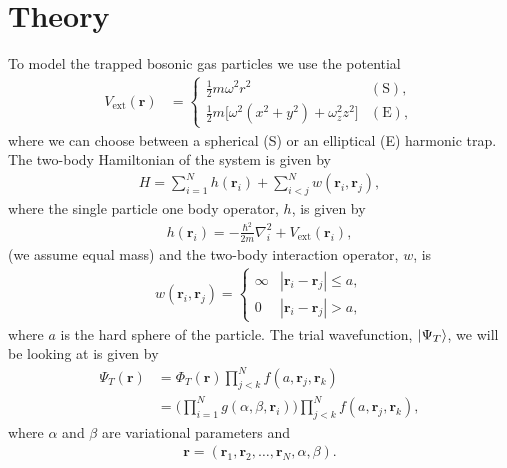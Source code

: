 \documentclass[
    a4paper, aps, twocolumn, floatfix, superscriptaddress, nofootinbib]{revtex4-1}
\newcommand{\vf}{\mathbf}
\newcommand{\1}{\mathds{1}}
\newcommand{\half}{\frac{1}{2}}
\begin{document}
\section{Theory}
    To model the trapped bosonic gas particles we use the potential
    \begin{align}
        V_{\text{ext}}(\vf{r})
        &=
        \begin{cases}
            \half m\omega^2r^2 & (\text{S}), \\
            \half m \bigl[
                \omega^2(x^2 + y^2) + \omega_z^2z^2
            \bigr] & (\text{E}),
        \end{cases}
    \end{align}
    where we can choose between a spherical (S) or an elliptical (E) harmonic
    trap. The two-body Hamiltonian of the system is given by
    \begin{align}
        H = \sum_{i = 1}^{N}h(\vf{r}_i) + \sum_{i < j}^{N}w(\vf{r}_i, \vf{r}_j),
    \end{align}
    where the single particle one body operator, $h$, is given by
    \begin{align}
        h(\vf{r}_i) = -\frac{\hbar^2}{2m}\nabla_i^2
        + V_{\text{ext}}(\vf{r}_i),
    \end{align}
    (we assume equal mass)
    and the two-body interaction operator, $w$, is
    \begin{align}
        w(\vf{r}_i, \vf{r}_j)
        = \begin{cases}
            \infty & |\vf{r}_i - \vf{r}_j| \leq a, \\
            0 & |\vf{r}_i - \vf{r}_j| > a,
        \end{cases}
    \end{align}
    where $a$ is the hard sphere of the particle. The trial wavefunction,
    $\ket{\Psi_T}$, we will
    be looking at is given by
    \begin{align}
        \Psi_T(\vf{r})
        &= \Phi_T(\vf{r})
        \prod_{j < k}^N f(a, \vf{r}_j, \vf{r}_k) \\
        &= \Biggl(
            \prod_{i = 1}^N g(\alpha, \beta, \vf{r}_i)
        \Biggr)
        \prod_{j < k}^N f(a, \vf{r}_j, \vf{r}_k),
        \label{eq:initial_trial_wavefunction}
    \end{align}
    where $\alpha$ and $\beta$ are variational parameters and
    \begin{align}
        \vf{r} = (\vf{r}_1, \vf{r}_2, \dots, \vf{r}_N, \alpha, \beta).
    \end{align}
\end{document}
